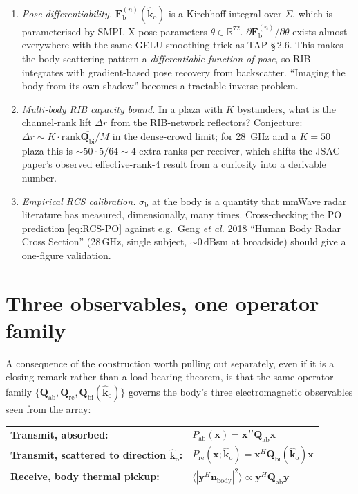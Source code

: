 \documentclass[11pt,a4paper]{article}
\theoremstyle{definition}
\newcommand{\diff}{\mathrm{d}}
\newcommand{\Reals}{\mathbb{R}}
\newcommand{\Qabs}{\mathbf{Q}_{\mathrm{ab}}}
\newcommand{\Qref}{\mathbf{Q}_{\mathrm{re}}}
\newcommand{\Qmis}{\mathbf{Q}_{\mathrm{mi}}}
\newcommand{\kout}{\hat{\bm{k}}_{\mathrm{o}}}
\newcommand{\Frib}{\mathbf{F}_{\mathrm{b}}}
\newcommand{\sigb}{\sigma_{\mathrm{b}}}
\newcommand{\Qbist}{\mathbf{Q}_{\mathrm{bi}}}
\begin{document}
\begin{enumerate}[leftmargin=1.6em,itemsep=3pt]
$\int_{S^2}\Qbist(\kout)\diff\Omega+\Qabs+\Qmis=\mathbf{I}$, with
$\Qmis=\int_{S^2}\Qmis^{(\kout)}\diff\Omega$ the
direction-resolved missed operator from
\texttt{q\_complement.tex} Eq.~(15).  This is the natural array-level
generalisation of the optical theorem.  Cleaning up the proof is a
half-day job.
\item \emph{Pose differentiability.}  $\Frib^{(n)}(\kout)$ is a Kirchhoff
integral over $\Sigma$, which is parameterised by SMPL-X pose
parameters $\theta\in\Reals^{72}$.  $\partial\Frib^{(n)}/\partial\theta$
exists almost everywhere with the same GELU-smoothing trick as TAP
\S\,2.6.  This makes the body scattering pattern a
\emph{differentiable function of pose}, so RIB integrates with
gradient-based pose recovery from backscatter.  ``Imaging the body
from its own shadow'' becomes a tractable inverse problem.
\item \emph{Multi-body RIB capacity bound.}  In a plaza with $K$
bystanders, what is the channel-rank lift $\Delta r$ from the
RIB-network reflectors?  Conjecture: $\Delta r\sim K\cdot
\mathrm{rank}\overline{\Qbist}/M$ in the dense-crowd limit; for
\SI{28}{GHz} and a $K=50$ plaza this is $\sim 50\cdot 5/64\sim 4$
extra ranks per receiver, which shifts the JSAC paper's observed
effective-rank-$4$ result from a curiosity into a derivable number.
\item \emph{Empirical RCS calibration.}  $\sigb$ at the body is a
quantity that mmWave radar literature has measured, dimensionally,
many times.  Cross-checking the PO prediction \cref{eq:RCS-PO}
against e.g.\ Geng \emph{et al.} 2018 ``Human Body Radar Cross
Section'' (28\,GHz, single subject, $\sim$0\,dBsm at broadside)
should give a one-figure validation.
\end{enumerate}

\section{Three observables, one operator family}\label{sec:triple}

A consequence of the construction worth pulling out separately, even
if it is a closing remark rather than a load-bearing theorem, is
that the same operator family
$\{\Qabs,\Qref,\Qbist(\kout)\}$ governs the body's three
electromagnetic observables seen from the array:

\begin{tabular}{ll}
\textbf{Transmit, absorbed:} &
$P_{\mathrm{ab}}(\mathbf{x})=\mathbf{x}^H\Qabs\mathbf{x}$ \\
\textbf{Transmit, scattered to direction $\kout$:} &
$P_{\mathrm{re}}(\mathbf{x};\kout)=\mathbf{x}^H\Qbist(\kout)\mathbf{x}$ \\
\textbf{Receive, body thermal pickup:} &
$\langle|\mathbf{y}^H\mathbf{n}_{\mathrm{body}}|^2\rangle
\propto\mathbf{y}^H\Qabs\mathbf{y}$ \\
\end{tabular}
\end{document}
